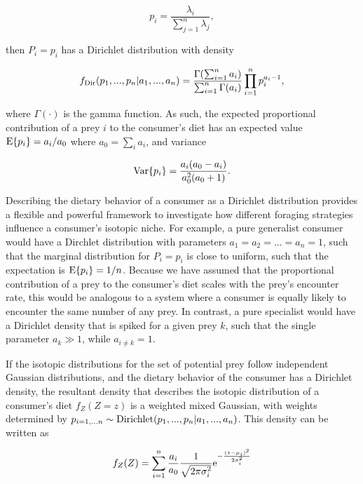 \documentclass[11pt]{article}
\begin{document}
\begin{equation}
  p_i = \frac{\lambda_i}{\sum_{j=1}^n \lambda_j},
\end{equation}

\noindent then $P_i = p_i$ has a Dirichlet distribution with density

\begin{equation}
  f_{\rm Dir}(p_1,...,p_n|a_1,...,a_n) = \frac{\Gamma(\sum_{i=1}^n a_i)}{\sum_{i=1}^n\Gamma(a_i)}\prod_{i=1}^n p_i^{a_i - 1},
\end{equation}

\noindent where $\Gamma(\cdot)$ is the gamma function.
As such, the expected proportional contribution of a prey $i$ to the consumer's diet has an expected value ${\rm E}\{p_i\}=a_i/a_0$ where $a_0 = \sum_i a_i$, and variance

\begin{equation}
  {\rm Var}\{p_i\} = \frac{a_i(a_0 - a_i)}{a_0^2(a_0 + 1)}.
\end{equation}

Describing the dietary behavior of a consumer as a Dirichlet distribution provides a flexible and powerful framework to investigate how different foraging strategies influence a consumer's isotopic niche.
For example, a pure generalist consumer would have a Dirchlet distribution with parameters $a_1 = a_2 = ... = a_n = 1$, such that the marginal distribution for $P_i = p_i$ is close to uniform, such that the expectation is ${\rm E}\{p_i\} = 1/n$.
Because we have assumed that the proportional contribution of a prey to the consumer's diet scales with the prey's encounter rate, this would be analogous to a system where a consumer is equally likely to encounter the same number of any prey.
In contrast, a pure specialist would have a Dirichlet density that is spiked for a given prey $k$, such that the single parameter $a_k \gg 1$, while $a_{i \neq k} = 1$.

If the isotopic distributions for the set of potential prey follow independent Gaussian distributions, and the dietary behavior of the consumer has a Dirichlet density, the resultant density that describes the isotopic distribution of a consumer's diet $f_Z(Z=z)$ is a weighted mixed Gaussian, with weights determined by $p_{i=1,...n} \sim {\rm Dirichlet}(p_1,...,p_n|a_1,...,a_n)$.
This density can be written as

\begin{equation}
f_Z(Z) = \sum_{i=1}^n \frac{a_i}{a_0}\frac{1}{\sqrt{2 \pi \sigma_i^2}}{\rm e}^{-\frac{(z-\mu_i)^2}{2\sigma_i^2}}
\end{equation}
\end{document}
